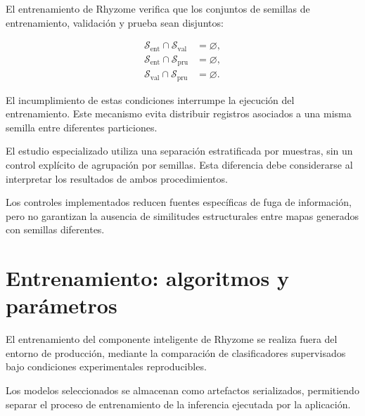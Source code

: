 El entrenamiento de Rhyzome verifica que los conjuntos de semillas de entrenamiento, validación y prueba sean disjuntos:

\begin{equation}
	\begin{aligned}
		\mathcal{S}_{\mathrm{ent}}
		\cap \mathcal{S}_{\mathrm{val}}
		&= \varnothing,\\
		\mathcal{S}_{\mathrm{ent}}
		\cap \mathcal{S}_{\mathrm{pru}}
		&= \varnothing,\\
		\mathcal{S}_{\mathrm{val}}
		\cap \mathcal{S}_{\mathrm{pru}}
		&= \varnothing.
	\end{aligned}
	\label{eq:separacion_semillas}
\end{equation}

El incumplimiento de estas condiciones interrumpe la ejecución del entrenamiento. Este mecanismo evita distribuir registros asociados a una misma semilla entre diferentes particiones.

El estudio especializado utiliza una separación estratificada por muestras, sin un control explícito de agrupación por semillas. Esta diferencia debe considerarse al interpretar los resultados de ambos procedimientos.

Los controles implementados reducen fuentes específicas de fuga de información, pero no garantizan la ausencia de similitudes estructurales entre mapas generados con semillas diferentes.

\FloatBarrier


\section{Entrenamiento: algoritmos y parámetros}
\label{sec:entrenamiento_ia}

El entrenamiento del componente inteligente de Rhyzome se realiza fuera del entorno de producción, mediante la comparación de clasificadores supervisados bajo condiciones experimentales reproducibles.

Los modelos seleccionados se almacenan como artefactos serializados, permitiendo separar el proceso de entrenamiento de la inferencia ejecutada por la aplicación.



